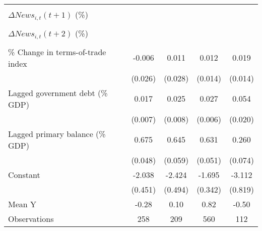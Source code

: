 {\begin{tabular}{l*{4}{c}}
                    &                     &                     &                     &                     \\
\addlinespace
$ \Delta News_{i,t}(t+1)$ (\%)&                     &                     &                     &                     \\
                    &                     &                     &                     &                     \\
\addlinespace
$ \Delta News_{i,t}(t+2)$ (\%)&                     &                     &                     &                     \\
                    &                     &                     &                     &                     \\
\addlinespace
\% Change in terms-of-trade index&      -0.006         &       0.011         &       0.012         &       0.019         \\
                    &     (0.026)         &     (0.028)         &     (0.014)         &     (0.014)         \\
\addlinespace
Lagged government debt (\% GDP)&       0.017\sym{**} &       0.025\sym{**} &       0.027\sym{***}&       0.054\sym{**} \\
                    &     (0.007)         &     (0.008)         &     (0.006)         &     (0.020)         \\
\addlinespace
Lagged primary balance (\% GDP)&       0.675\sym{***}&       0.645\sym{***}&       0.631\sym{***}&       0.260\sym{***}\\
                    &     (0.048)         &     (0.059)         &     (0.051)         &     (0.074)         \\
\addlinespace
Constant            &      -2.038\sym{***}&      -2.424\sym{***}&      -1.695\sym{***}&      -3.112\sym{***}\\
                    &     (0.451)         &     (0.494)         &     (0.342)         &     (0.819)         \\
\midrule
Mean Y              &       -0.28         &        0.10         &        0.82         &       -0.50         \\
Observations        &         258         &         209         &         560         &         112         \\
\bottomrule
\end{tabular}
}
